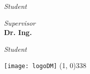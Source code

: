 \begin{titlepage}
\begin{center}
{\begin{large}
    \vspace*{-4.23cm} 

    \begin{flushright}
    \textit{Student}\\ 
    \vspace{5pt} 
    \textbf{\myName}
    \end{flushright}
    \end{large}
}{
    \begin{large}
    \begin{flushleft}
    \textit{Supervisor}\\ 
    \vspace{5pt} 
    \textbf{Dr. Ing. \mySupervisor}
    \end{flushleft}

    \vspace*{-2.36cm} 

    \begin{flushright}
    \textit{Student}\\ 
    \vspace{5pt} 
    \textbf{\myName}
    \end{flushright}
    \end{large}
}

\vfill
\texttt{[image: logoDM]}
\line(1, 0){338} \\
\begin{normalsize}
\textsc{\myTime}
\end{normalsize}

\end{center}
\end{titlepage}
